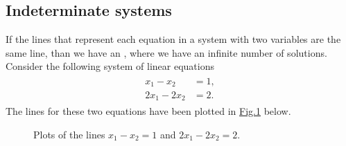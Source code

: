 \documentclass[letterpaper,10pt,english]{jupyterBook}
\begin{document}
\subsection{Indeterminate systems}
\label{\detokenize{_pages/2.6_Consistent_systems:indeterminate-systems}}\label{\detokenize{_pages/2.6_Consistent_systems:index-5}}
\sphinxAtStartPar
If the lines that represent each equation in a system with two variables are the same line, than we have an , where we have an infinite number of solutions. Consider the following system of linear equations
\begin{equation*}
\begin{split} \begin{align*}
    x_1 - x_2 &= 1, \\
    2x_1 - 2x_2 &= 2.
\end{align*} \end{split}
\end{equation*}
\sphinxAtStartPar
The lines for these two equations have been plotted in \hyperref[\detokenize{_pages/2.6_Consistent_systems:indeterminate-system-plot}]{Fig.\@ \ref{\detokenize{_pages/2.6_Consistent_systems:indeterminate-system-plot}}} below.

\begin{figure}[htbp]
\centering
\capstart

\noindent{}
\caption{Plots of the lines \(x_1 - x_2 = 1\) and \(2x_1 - 2x_2 = 2\).}\label{\detokenize{_pages/2.6_Consistent_systems:indeterminate-system-plot}}\end{figure}
\end{document}
